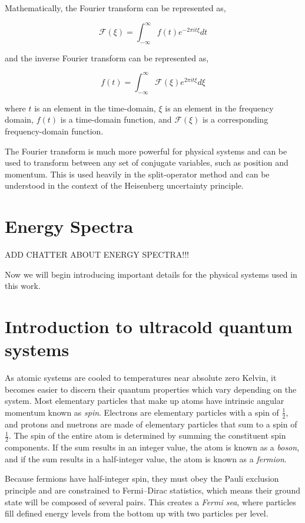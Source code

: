Mathematically, the Fourier transform can be represented as,

$$
\mathcal{F}(\xi) = \int_{-\infty}^{\infty}f(t)e^{-2\pi i t \xi}dt
$$

and the inverse Fourier transform can be represented as,

$$
f(t) = \int_{-\infty}^{\infty}\mathcal{F}(\xi)e^{2\pi i t \xi}d\xi
$$

where $t$ is an element in the time-domain, $\xi$ is an element in the frequency domain, $f(t)$ is a time-domain function, and $\mathcal{F}(\xi)$ is a corresponding frequency-domain function.

The Fourier transform is much more powerful for physical systems and can be used to transform between any set of conjugate variables, such as position and momentum.
This is used heavily in the split-operator method and can be understood in the context of the Heisenberg uncertainty principle.


\section{Energy Spectra}

ADD CHATTER ABOUT ENERGY SPECTRA!!!

Now we will begin introducing important details for the physical systems used in this work.

\section{Introduction to ultracold quantum systems}

As atomic systems are cooled to temperatures near absolute zero Kelvin, it becomes easier to discern their quantum properties which vary depending on the system.
Most elementary particles that make up atoms have intrinsic angular momentum known as \textit{spin}.
Electrons are elementary particles with a spin of $\frac{1}{2}$, and protons and nuetrons are made of elementary particles that sum to a spin of $\frac{1}{2}$.
The spin of the entire atom is determined by summing the constituent spin components.
If the sum results in an integer value, the atom is known as a \textit{boson}, and if the sum results in a half-integer value, the atom is known as a \textit{fermion}.

Because fermions have half-integer spin, they must obey the Pauli exclusion principle and are constrained to Fermi--Dirac statistics, which means their ground state will be composed of several pairs.
This creates a \textit{Fermi sea}, where particles fill defined energy levels from the bottom up with two particles per level.

